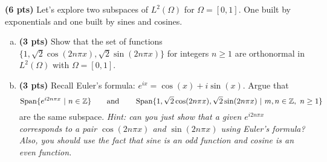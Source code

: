 \documentclass[12pt]{article} %
\begin{document}
\vspace*{1cm}
\begin{problem}
\textbf{(6 pts)} Let's explore two subspaces of $L^2(\Omega)$ for $\Omega = [0,1]$. One built by exponentials and one built by sines and cosines.
	\begin{enumerate}[(a)]
		\item \textbf{(3 pts)} Show that the set of functions $\{1,\sqrt{2}\cos(2n \pi x), \sqrt{2}\sin(2n \pi x)\}$ for integers $n\geq 1$ are orthonormal in $L^2(\Omega)$ with $\Omega = [0,1]$.
		\item \textbf{(3 pts)} Recall Euler's formula: $e^{ix} = \cos(x)+i\sin(x)$.  Argue that 
\[
\operatorname{Span}\{e^{i2n\pi x} ~|~ n \in \mathbb{Z}\} \qquad \textrm{and} \qquad \operatorname{Span}\{1,\sqrt{2}\cos(2n \pi x), \sqrt{2}\sin(2n \pi x) ~|~ m,n \in \mathbb{Z}, ~ n\geq 1\}
\]
are the same subspace. \emph{Hint: can you just show that a given $e^{i2n\pi x}$ corresponds to a pair $\cos(2n \pi x)$ and $\sin(2n \pi x)$ using Euler's formula? Also, you should use the fact that sine is an odd function and cosine is an even function.}
	\end{enumerate}
\end{problem}
\vspace*{1cm}
\end{document}
